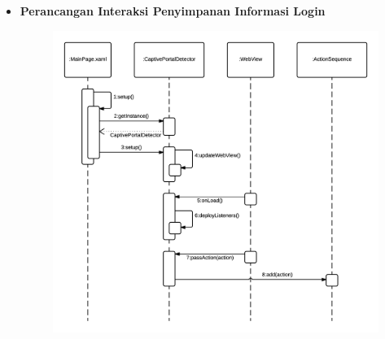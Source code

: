 \documentclass[a4paper,twoside]{article}
\begin{document}
\begin{enumerate}
\begin{itemize}
{\begin{itemize}
{                        Gambar \ref{fig:PasswordGenerationSequenceDiagram} menjelaskan mengenai interaksi antar objek dalam perangkat lunak untuk menciptakan password random saat perangkat lunak pertama kali dijalankan. Interaksi yang terjadi adalah sebagai berikut:

                        \begin{enumerate}
                            \item{MainPage.xaml melakukan setup().}
                            \item{MainPage.xaml memanggil metode getInstance() pada CaptivePortalDetector untuk mendapatkan \textit{instance} CaptivePortalDetector.}
                            \item{CaptivePortalDetector menciptakan objek Storage baru pada \textit{constructor}-nya.}
                            \item{Objek Storage berusaha untuk mendapatkan password dengan memangil metode Retrieve() pada objek PasswordVault, namun mendapatkan exception karena belum ada password yang disimpan.}
                            \item{Objek Storage memasukkan password baru yang diciptakan secara random menggunakan metode Add() pada PasswordVault.}
                            \item{Objek Storage memanggil metode Retrieve() kembali pada objek PasswordVault, dan mendapatkan password yang baru saja diciptakan. Setelah itu, CaptivePortalDetector mendapatkan objek Storage, dan MainPage.xaml mendapatkan \textit{instance} CaptivePortalDetector.}
                        \end{enumerate}
                    }
                    \item{
                        {\bf Perancangan Interaksi Penyimpanan Informasi Login}
                        \begin{figure}[!htb]
                            \centering
                            \includegraphics[scale=0.9]{SequenceDiagramLoginInformationSaving.png}

\end{figure}}
\end{itemize}}
\end{itemize}
\end{enumerate}
\end{document}

